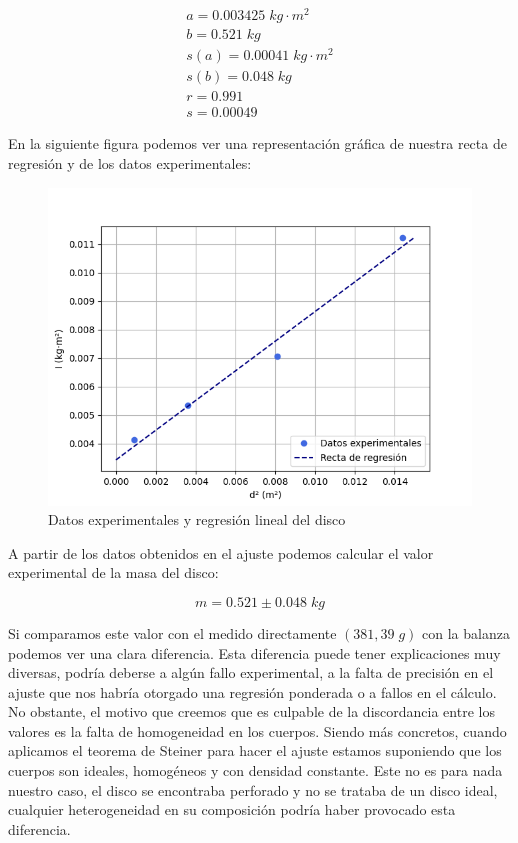 \documentclass[a4paper,12pt,titlepage]{article}
\begin{document}
\begin{equation}
    \begin{gathered}
        a = 0.003425 \; kg\cdot m^2 \\
        b = 0.521 \; kg\\
        s(a) = 0.00041 \; kg\cdot m^2 \\
        s(b) = 0.048 \; kg \\
        r = 0.991 \\
        s = 0.00049
    \end{gathered}
\end{equation}

En la siguiente figura podemos ver una representación gráfica de nuestra recta de regresión y de los datos experimentales:

\begin{figure}[h!]
    \centering
    \includegraphics[width=0.85\linewidth]{Images/regSteiner1.png}
    \caption{Datos experimentales y regresión lineal del disco}
\end{figure}

A partir de los datos obtenidos en el ajuste podemos calcular el valor experimental de la masa del disco:

\begin{equation}
    m = 0.521 \pm 0.048 \; kg
\end{equation}

Si comparamos este valor con el medido directamente $(381,39 \;g)$ con la balanza podemos ver una clara diferencia. Esta diferencia puede tener explicaciones muy diversas, podría deberse a algún fallo experimental, a la falta de precisión en el ajuste que nos habría otorgado una regresión ponderada o a fallos en el cálculo. No obstante, el motivo que creemos que es culpable de la discordancia entre los valores es la falta de homogeneidad en los cuerpos. Siendo más concretos, cuando aplicamos el teorema de Steiner para hacer el ajuste estamos suponiendo que los cuerpos son ideales, homogéneos y con densidad constante. Este no es para nada nuestro caso, el disco se encontraba perforado y no se trataba de un disco ideal, cualquier heterogeneidad en su composición podría haber provocado esta diferencia.
\end{document}
